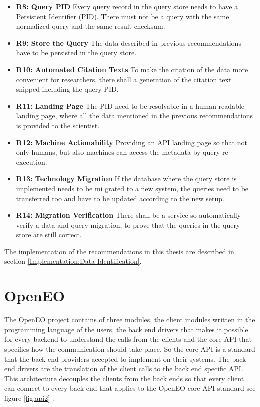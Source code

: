 \documentclass[draft,final]{vutinfth} %
\begin{document}
\begin{itemize}
	\item \textbf{R8: Query PID}
	Every query record in the query store needs to have a Persistent Identifier (PID). There must not be a query with the same normalized query and the same result checksum. 
	\item \textbf{R9: Store the Query}
	The data described in previous recommendations have to be persisted in the query store.
	\item \textbf{R10: Automated Citation Texts}
	To make the citation of the data more convenient for researchers, there shall a generation of the citation text snipped including the query PID.
	\item \textbf{R11: Landing Page}
	The PID need to be resolvable in a human readable landing page, where all the data mentioned in the previous recommendations is provided to the scientist.
	\item \textbf{R12: Machine Actionability}
	Providing an API landing page so that not only humans, but also machines can access the metadata by query re-execution.
	\item \textbf{R13: Technology Migration}
	If the database where the query store is implemented needs to be mi grated to a new system, the queries need to be transferred too and have to be updated according to the new setup.
	\item \textbf{R14: Migration Verification}
	There shall be a service so automatically verify a data and query migration, to prove that the queries in the query store are still correct. 
\end{itemize}
 The implementation of the recommendations in this thesis are described in section \ref{Implementation:Data Identification}. 

\section{OpenEO}\label{OpenEO}
The OpenEO project contains of three modules, the client modules written in the programming language of the users, the back end drivers that makes it possible for every backend to understand the calls from the clients and the core API that specifies how the communication should take place. So the core API is a standard that the back end providers accepted to implement on their systems. The back end drivers are the translation of the client calls to the back end specific API. This architecture decouples the clients from the back ends so that every client can connect to every back end that applies to the OpenEO core API standard see figure \ref{fig:api2} \cite{openeo}.   
\end{document}
